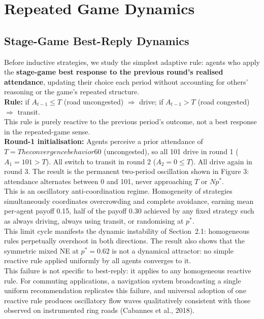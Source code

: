 \section{Repeated Game Dynamics}

\subsection{Stage-Game Best-Reply Dynamics}

Before inductive strategies, we study the simplest adaptive rule: agents who apply the \textbf{stage-game best response to the previous round's realised attendance}, updating their choice each period without accounting for others' reasoning or the game's repeated structure. \\

\textbf{Rule:} if $A_{t-1} \leq T$ (road uncongested) $\Rightarrow$ drive; if $A_{t-1} > T$ (road congested) $\Rightarrow$ transit. \\

This rule is purely reactive to the previous period's outcome, not a best response in the repeated-game sense.\\

\textbf{Round-1 initialisation:} Agents perceive a prior attendance of $T = The convergence behavior60$ (uncongested), so all 101 drive in round 1 ($A_1 = 101 > T$). All switch to transit in round 2 ($A_2 = 0 \leq T$). All drive again in round 3. The result is the permanent two-period oscillation shown in Figure 3: attendance alternates between 0 and 101, never approaching $T$ or $Np^*$. \\

This is an oscillatory anti-coordination regime. Homogeneity of strategies simultaneously coordinates overcrowding and complete avoidance, earning mean per-agent payoff 0.15, half of the payoff 0.30 achieved by any fixed strategy such as always driving, always using transit, or randomising at $p^*$. \\

This limit cycle manifests the dynamic instability of Section~2.1: homogeneous rules perpetually overshoot in both directions. The result also shows that the symmetric mixed NE at $p^* = 0.62$ is not a dynamical attractor: no simple reactive rule applied uniformly by all agents converges to it. \\

This failure is not specific to best-reply: it applies to any homogeneous reactive rule. For commuting applications, a navigation system broadcasting a single uniform recommendation replicates this failure, and universal adoption of one reactive rule produces oscillatory flow waves qualitatively consistent with those observed on instrumented ring roads (Cabannes et al., 2018). \\

